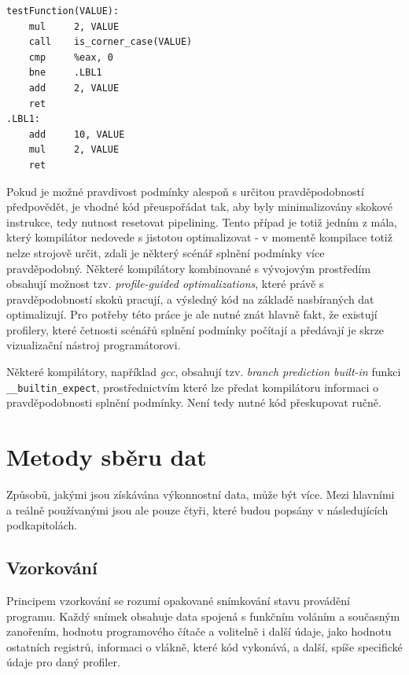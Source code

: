 \documentclass[czech,BP]{thesiskiv}
\begin{document}
\lstset{escapechar=@,style=customasm}
\begin{lstlisting}[caption=Pseudoassembly verze kódu \ref{branch_2_c}, label=branch_2_asm]
testFunction(VALUE):
    mul     2, VALUE
    call    is_corner_case(VALUE)
    cmp     %eax, 0
    bne     .LBL1
    add     2, VALUE
    ret
.LBL1:
    add     10, VALUE
    mul     2, VALUE
    ret
\end{lstlisting}

Pokud je možné pravdivost podmínky alespoň s určitou pravděpodobností předpovědět, je vhodné kód přeuspořádat tak, aby byly minimalizovány skokové instrukce, tedy nutnost resetovat pipelining. Tento případ je totiž jedním z mála, který kompilátor nedovede s jistotou optimalizovat - v momentě kompilace totiž nelze strojově určit, zdali je některý scénář splnění podmínky více pravděpodobný. Některé kompilátory kombinované s vývojovým prostředím obsahují možnost tzv. \emph{profile-guided optimalizations}, které právě s pravděpodobností skoků pracují, a výsledný kód na základě nasbíraných dat optimalizují. Pro potřeby této práce je ale nutné znát hlavně fakt, že existují profilery, které četnosti scénářů splnění podmínky počítají a předávají je skrze vizualizační nástroj programátorovi.

Některé kompilátory, například \emph{gcc}, obsahují tzv. \emph{branch prediction built-in} funkci \texttt{\_\_builtin\_expect}, prostřednictvím které lze předat kompilátoru informaci o pravděpodobnosti splnění podmínky. Není tedy nutné kód přeskupovat ručně.



\section{Metody sběru dat}

Způsobů, jakými jsou získávána výkonnostní data, může být více. Mezi hlavními a reálně používanými jsou ale pouze čtyři, které budou popsány v následujících podkapitolách.

\subsection{Vzorkování}\label{subsec:sampling}

Principem vzorkování se rozumí opakované snímkování stavu provádění programu. Každý snímek obsahuje data spojená s funkčním voláním a současným zanořením, hodnotu programového čítače a volitelně i další údaje, jako hodnotu ostatních registrů, informaci o vlákně, které kód vykonává, a další, spíše specifické údaje pro daný profiler.
\end{document}
